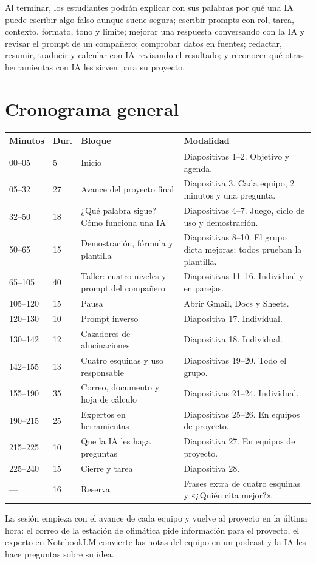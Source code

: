 \documentclass[11pt,a4paper]{article}
\begin{document}
\medskip
Al terminar, los estudiantes podrán explicar con sus palabras por qué una IA puede escribir algo falso aunque suene segura; escribir prompts con rol, tarea, contexto, formato, tono y límite; mejorar una respuesta conversando con la IA y revisar el prompt de un compañero; comprobar datos en fuentes; redactar, resumir, traducir y calcular con IA revisando el resultado; y reconocer qué otras herramientas con IA les sirven para su proyecto.

\section{Cronograma general}
\small
\begin{longtable}{@{}p{2.0cm}p{1.1cm}p{5.2cm}p{5.6cm}@{}}
\toprule \textbf{Minutos} & \textbf{Dur.} & \textbf{Bloque} & \textbf{Modalidad}\\\midrule\endhead
00--05 & 5 & Inicio & Diapositivas 1--2. Objetivo y agenda.\\
05--32 & 27 & Avance del proyecto final & Diapositiva 3. Cada equipo, 2 minutos y una pregunta.\\
32--50 & 18 & ¿Qué palabra sigue? Cómo funciona una IA & Diapositivas 4--7. Juego, ciclo de uso y demostración.\\
50--65 & 15 & Demostración, fórmula y plantilla & Diapositivas 8--10. El grupo dicta mejoras; todos prueban la plantilla.\\
65--105 & 40 & Taller: cuatro niveles y prompt del compañero & Diapositivas 11--16. Individual y en parejas.\\
105--120 & 15 & Pausa & Abrir Gmail, Docs y Sheets.\\
120--130 & 10 & Prompt inverso & Diapositiva 17. Individual.\\
130--142 & 12 & Cazadores de alucinaciones & Diapositiva 18. Individual.\\
142--155 & 13 & Cuatro esquinas y uso responsable & Diapositivas 19--20. Todo el grupo.\\
155--190 & 35 & Correo, documento y hoja de cálculo & Diapositivas 21--24. Individual.\\
190--215 & 25 & Expertos en herramientas & Diapositivas 25--26. En equipos de proyecto.\\
215--225 & 10 & Que la IA les haga preguntas & Diapositiva 27. En equipos de proyecto.\\
225--240 & 15 & Cierre y tarea & Diapositiva 28.\\
--- & 16 & Reserva & Frases extra de cuatro esquinas y «¿Quién cita mejor?».\\\bottomrule
\end{longtable}
\normalsize
La sesión empieza con el avance de cada equipo y vuelve al proyecto en la última hora: el correo de la estación de ofimática pide información para el proyecto, el experto en NotebookLM convierte las notas del equipo en un podcast y la IA les hace preguntas sobre su idea.
\end{document}
